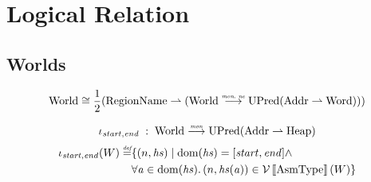 \documentclass{article}
\newcommand{\sem}[1]{\left\llbracket #1 \right\rrbracket}
\newcommand{\parfun}{\rightharpoonup}
\newcommand{\monnefun}{\stackrel{\textit{\tiny{mon, ne}}}{\longrightarrow}}
\newcommand{\monfun}{\stackrel{\textit{\tiny{mon}}}{\longrightarrow}}
\newcommand{\defeq}{\stackrel{\textit{\tiny{def}}}{=}}
\DeclareMathOperator{\dom}{dom}
\newcommand{\var}[1]{\mathit{#1}}
\newcommand{\addr}{\var{a}}
\newcommand{\heapseg}{\var{hs}}
\newcommand{\asmType}{\plaindom{AsmType}}
\newcommand{\plaindom}[1]{\mathrm{#1}}
\newcommand{\Words}{\plaindom{Word}}
\newcommand{\Addrs}{\plaindom{Addr}}
\newcommand{\Heaps}{\plaindom{Heap}}
\newcommand{\RegionName}{\plaindom{RegionName}}
\newcommand{\Worlds}{\plaindom{World}}
\newcommand{\UPred}[1]{\plaindom{UPred}(#1)}
\newcommand{\intr}[2]{\mathcal{#1}\sem{#2}}
\newcommand{\valueintr}[1]{\intr{V}{#1}}
\newcommand{\stdvr}{\valueintr{\asmType}}
\newcommand{\npair}[2][n]{\left(#1,#2 \right)}
\begin{document}
\section{Logical Relation}
\label{sec:logical-relation}
\subsection{Worlds}
\[
\Worlds \cong \frac{1}{2} (\RegionName \parfun (\Worlds \monnefun \UPred{\Addrs \parfun \Words}))
\]

\[
  \iota_{\var{start},\var{end}} \; : \; \Worlds \monfun \UPred{\Addrs \parfun \Heaps}
\]
\begin{align*}
  \iota_{\var{start},\var{end}}(W) \defeq & \{ \npair{\heapseg} \mid \dom(\heapseg) = [\var{start},\var{end}] \land \\
                                     & \forall \addr \in \dom(\heapseg) \ldotp \npair{\heapseg(\addr)} \in \stdvr(W) \}
\end{align*}
\end{document}
